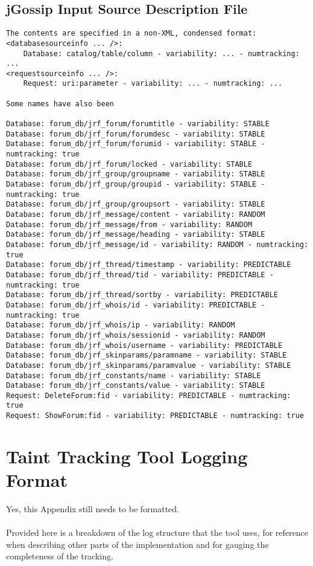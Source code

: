 \documentclass[msc,oneside]{ubcthesis}
\begin{document}
\section{jGossip Input Source Description File}
\label{idf:jgossip}
\begin{verbatim}
The contents are specified in a non-XML, condensed format:
<databasesourceinfo ... />:
	Database: catalog/table/column - variability: ... - numtracking: ...
<requestsourceinfo ... />:
	Request: uri:parameter - variability: ... - numtracking: ...
	
Some names have also been 
	
Database: forum_db/jrf_forum/forumtitle - variability: STABLE
Database: forum_db/jrf_forum/forumdesc - variability: STABLE
Database: forum_db/jrf_forum/forumid - variability: STABLE - numtracking: true
Database: forum_db/jrf_forum/locked - variability: STABLE
Database: forum_db/jrf_group/groupname - variability: STABLE
Database: forum_db/jrf_group/groupid - variability: STABLE - numtracking: true
Database: forum_db/jrf_group/groupsort - variability: STABLE
Database: forum_db/jrf_message/content - variability: RANDOM
Database: forum_db/jrf_message/from - variability: RANDOM
Database: forum_db/jrf_message/heading - variability: STABLE
Database: forum_db/jrf_message/id - variability: RANDOM - numtracking: true
Database: forum_db/jrf_thread/timestamp - variability: PREDICTABLE
Database: forum_db/jrf_thread/tid - variability: PREDICTABLE - numtracking: true
Database: forum_db/jrf_thread/sortby - variability: PREDICTABLE
Database: forum_db/jrf_whois/id - variability: PREDICTABLE - numtracking: true
Database: forum_db/jrf_whois/ip - variability: RANDOM
Database: forum_db/jrf_whois/sessionid - variability: RANDOM
Database: forum_db/jrf_whois/username - variability: PREDICTABLE
Database: forum_db/jrf_skinparams/paramname - variability: STABLE
Database: forum_db/jrf_skinparams/paramvalue - variability: STABLE
Database: forum_db/jrf_constants/name - variability: STABLE
Database: forum_db/jrf_constants/value - variability: STABLE
Request: DeleteForum:fid - variability: PREDICTABLE - numtracking: true
Request: ShowForum:fid - variability: PREDICTABLE - numtracking: true
\end{verbatim}

\chapter{Taint Tracking Tool Logging Format}

Yes, this Appendix still needs to be formatted.\\\\
Provided here is a breakdown of the log structure that the tool uses, for reference when describing other parts of the implementation and for gauging the completeness of the tracking.
\end{document}
